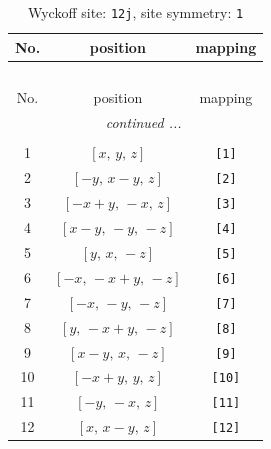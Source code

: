 \documentclass[fleqn,8pt]{jsarticle}
\begin{document}
\begin{longtable}{ccc}
\caption{Wyckoff site: {\tt 12j}, site symmetry: {\tt 1}}
 \\
 \hline \hline
No. & position & mapping \\ \hline \endfirsthead

\multicolumn{2}{l}{\tablename\ \thetable{}} \\
 \hline \hline
No. & position & mapping \\ \hline \endhead

 \hline \hline
\multicolumn{2}{r}{\footnotesize\it continued ...} \\ \endfoot

 \hline \hline
\multicolumn{2}{r}{} \\ \endlastfoot

1 & $\left[ x,\, y,\, z \right]$ & {\tt [1]} \\ \hline
2 & $\left[ - y,\, x - y,\, z \right]$ & {\tt [2]} \\ \hline
3 & $\left[ - x + y,\, - x,\, z \right]$ & {\tt [3]} \\ \hline
4 & $\left[ x - y,\, - y,\, - z \right]$ & {\tt [4]} \\ \hline
5 & $\left[ y,\, x,\, - z \right]$ & {\tt [5]} \\ \hline
6 & $\left[ - x,\, - x + y,\, - z \right]$ & {\tt [6]} \\ \hline
7 & $\left[ - x,\, - y,\, - z \right]$ & {\tt [7]} \\ \hline
8 & $\left[ y,\, - x + y,\, - z \right]$ & {\tt [8]} \\ \hline
9 & $\left[ x - y,\, x,\, - z \right]$ & {\tt [9]} \\ \hline
10 & $\left[ - x + y,\, y,\, z \right]$ & {\tt [10]} \\ \hline
11 & $\left[ - y,\, - x,\, z \right]$ & {\tt [11]} \\ \hline
12 & $\left[ x,\, x - y,\, z \right]$ & {\tt [12]} \\
\end{longtable}
\end{document}
